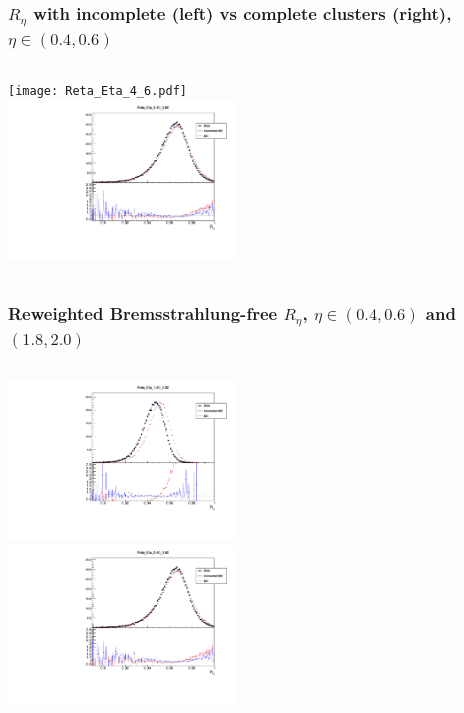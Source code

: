 \documentclass{beamer}
\begin{document}
\begin{frame}
\frametitle{$R_\eta$ with incomplete (left) vs complete clusters (right), $\eta \in (0.4, 0.6)$ }

\begin{columns}[t]
\centering
\texttt{[image: Reta\_Eta\_4\_6.pdf]}\\
\centering
\includegraphics[width=6cm]{Reta_Eta_4_6_Athena.pdf}\\
\end{columns}
\end{frame}
\begin{frame}
\frametitle{Reweighted Bremsstrahlung-free $R_\eta$, $\eta \in (0.4, 0.6)$ and $(1.8, 2.0)$}

\begin{columns}[t]
\centering
\includegraphics[width=6cm]{Reta_Rew_Eta_18_20_Local_Rew_noBS.pdf}\\

\includegraphics[width=6cm]{Reta_Rew_Eta_4_6_Local_Rew_noBS.pdf}\\
\centering
\end{columns}
\end{frame}
\end{document}
